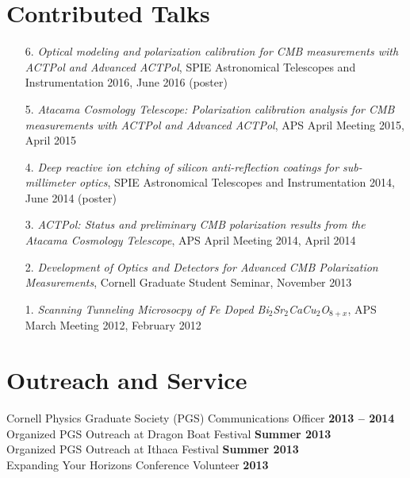 \documentclass[margin,line]{res}
\begin{document}
\begin{resume}
\section{\sc Contributed Talks} 
\begin{enumerate}
    \item[{6.}] {\it Optical modeling and polarization calibration for CMB measurements with ACTPol and Advanced ACTPol}, SPIE Astronomical Telescopes and Instrumentation 2016, June 2016 (poster)
    \item[{5.}] {\it Atacama Cosmology Telescope: Polarization calibration analysis for CMB measurements with ACTPol and Advanced ACTPol},
      APS April Meeting 2015, April 2015
    \item[{4.}] {\it Deep reactive ion etching of silicon anti-reflection coatings for sub-millimeter optics},
      SPIE Astronomical Telescopes and Instrumentation 2014, June 2014 (poster)
    \item[{3.}] {\it ACTPol: Status and preliminary CMB polarization results from the Atacama Cosmology Telescope},
      APS April Meeting 2014, April 2014
    \item[{2.}] {\it Development of Optics and Detectors for Advanced CMB Polarization Measurements},
      Cornell Graduate Student Seminar, November 2013
    \item[{1.}] {\it Scanning Tunneling Microsocpy of Fe Doped Bi$_2$Sr$_2$CaCu$_2$O$_{8+x}$},
      APS March Meeting 2012, February 2012
\end{enumerate}

\section{\sc Outreach and Service} 
Cornell Physics Graduate Society (PGS) Communications Officer \hfill \textbf{2013 -- 2014}\\
Organized PGS Outreach at Dragon Boat Festival \hfill \textbf{Summer 2013}\\
Organized PGS Outreach at Ithaca Festival \hfill \textbf{Summer 2013}\\
Expanding Your Horizons Conference Volunteer \hfill \textbf{2013}\\

\end{resume} 
\end{document}
